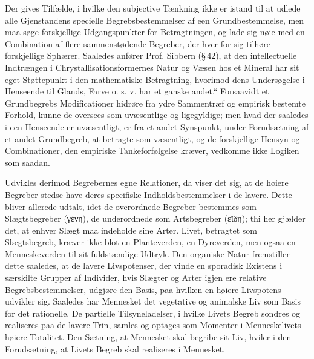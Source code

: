 \documentclass[12pt]{book}
\newcommand{\opage}[1]{\marginnote{\footnotesize\textit{[#1]}}}
\begin{document}
Der gives Tilfælde, i hvilke den subjective Tænkning ikke er istand til at
udlede alle Gjenstandens specielle Begrebsbestemmelser af een
Grundbestemmelse, men maa søge forskjellige Udgangspunkter for Betragtningen,
og lade sig nøie med en Combination af flere sammenstødende Begreber, der hver
for sig tilhøre forskjellige Sphærer. Saaledes anfører Prof. Sibbern
(\S\,42), at den intellectuelle Indtrængen i Chrystallisationsformernes Natur
og Væsen hos et Mineral har sit eget Støttepunkt i den mathematiske
Betragtning, hvorimod dens Undersøgelse i Henseende til Glands, Farve o. s. v.
har et ganske andet.“ Forsaavidt et Grundbegrebs Modificationer hidrøre fra
ydre Sammentræf og empirisk bestemte Forhold, kunne de oversees som
uvæsentlige og ligegyldige; men hvad der saaledes i een Henseende er
uvæsentligt, er fra et andet Synspunkt, under Forudsætning af et andet
Grundbegreb, at betragte som væsentligt, og de forskjellige Hensyn og
Combinationer, den empiriske Tankeforfølgelse kræver, vedkomme ikke Logiken
som saadan.

Udvikles derimod Begrebernes egne Relationer, da viser det sig, at de høiere
Begreber stedse have deres specifiske Indholdsbestemmelser i de lavere. Dette
bliver allerede udtalt, idet de overordnede Begreber bestemmes som
Slægtsbegreber (γένη), de underordnede som Artsbegreber (εἴδη); thi her
gjælder det, at enhver Slægt maa indeholde sine Arter. Livet, betragtet som
Slægtsbegreb,
\opage{30} kræver ikke blot en Planteverden, en Dyreverden, men ogsaa en Menneskeverden til
sit fuldstændige Udtryk. Den organiske Natur fremstiller dette saaledes, at de
lavere Livspotenser, der vinde en sporadisk Existens i særskilte Grupper af
Individer, hvis Slægter og Arter igjen ere relative Begrebsbestemmelser, udgjøre
den Basis, paa hvilken en høiere Livspotens udvikler sig. Saaledes har Mennesket
det vegetative og animalske Liv som Basis for det rationelle. De partielle
Tilsyneladelser, i hvilke Livets Begreb sondres og realiseres paa de lavere
Trin, samles og optages som Momenter i Menneskelivets høiere Totalitet. Den
Sætning, at Mennesket skal begribe sit Liv, hviler i den Forudsætning, at Livets
Begreb skal realiseres i Mennesket.
\end{document}
